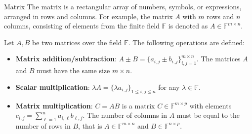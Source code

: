 \documentclass{beamer}
\begin{document}
    \begin{frame}{Matrix}
        The matrix is a rectangular array of numbers, symbols, or expressions, arranged in rows and 
        columns. For example, the matrix $A$ with $m$ rows and $n$ columns, consisting of elements 
        from the finite field $\mathbb{F}$ is denoted as $A \in \mathbb{F}^{m \times n}$. 

        \begin{definition}
            Let $A,B$ be two matrices over the field $\mathbb{F}$. The following operations are defined:
            \begin{itemize}
                \item \textbf{Matrix addition/subtraction}: $A \pm B = \{a_{i,j} \pm b_{i,j}\}_{i,j=1}^{m \times n}$. The matrices $A$ and $B$ must have the same size $m \times n$.
                \item \textbf{Scalar multiplication}: $\lambda A = \{\lambda a_{i,j}\}_{1\leq i,j \leq n}$ for any $\lambda \in \mathbb{F}$.
                \item \textbf{Matrix multiplication}: $C = AB$ is a matrix $C \in \mathbb{F}^{m \times p}$ with elements $c_{i,j} = \sum_{\ell=1}^{n} a_{i,\ell}b_{\ell,j}$. The number of columns in $A$ must be equal to the number of rows in $B$, that is $A \in \mathbb{F}^{m \times n}$ and $B \in \mathbb{F}^{n \times p}$.
            \end{itemize}
        \end{definition}
    \end{frame}
\end{document}
